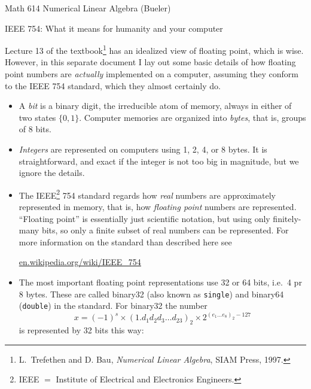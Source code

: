 \documentclass[11pt]{amsart}
\begin{document}
\scriptsize \noindent Math 614 Numerical Linear Algebra (Bueler) \hfill {}
\normalsize

\medskip\bigskip
\LARGE\centerline{IEEE 754: What it means for humanity and your computer}

\bigskip
\normalsize

\thispagestyle{empty}

Lecture 13 of the textbook\footnote{L.~Trefethen and D. Bau, \emph{Numerical Linear Algebra}, SIAM Press, 1997.} has an idealized view of floating point, which is wise.  However, in this separate document I lay out some basic details of how floating point numbers are \emph{actually} implemented on a computer, assuming they conform to the IEEE 754 standard, which they almost certainly do.

\bigskip
\begin{itemize}
\setlength\itemsep{1em}
\item A \emph{bit} is a binary digit, the irreducible atom of memory, always in either of two states $\{0,1\}$.  Computer memories are organized into \emph{bytes}, that is, groups of 8 bits.

\item \emph{Integers} are represented on computers using 1, 2, 4, or 8 bytes.  It is straightforward, and exact if the integer is not too big in magnitude, but we ignore the details.

\item The IEEE\footnote{IEEE $=$ Institute of Electrical and Electronics Engineers.} 754 standard regards how \emph{real} numbers are approximately represented in memory, that is, how \emph{floating point} numbers are represented.  ``Floating point'' is essentially just scientific notation, but using only finitely-many bits, so only a finite subset of real numbers can be represented.    For more information on the standard than described here see

 \centerline{\url{en.wikipedia.org/wiki/IEEE_754}}


\item The most important floating point representations use 32 or 64 bits, i.e.~4 pr 8 bytes.  These are called binary32 (also known as \texttt{single}) and binary64 (\texttt{double}) in the standard.  For binary32 the number
       $$x = (-1)^s \times \left(1.d_1 d_2 d_3 \dots d_{23}\right)_{2} \times 2^{\left(e_1\dots e_8\right)_2 - 127}$$
is represented by 32 bits this way:

\medskip
\hspace{-30mm}


\end{itemize}
\end{document}
